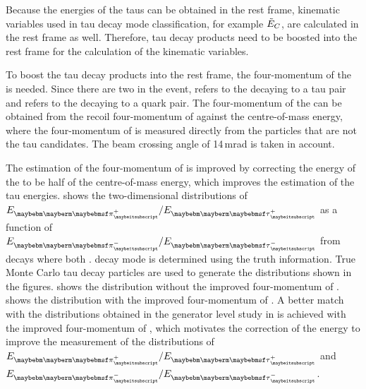 Because the energies of the taus can be obtained in the \PZ rest frame, kinematic variables used in tau decay mode classification, for example $\tilde{E}_{C}$, are calculated in the \PZ rest frame as well. Therefore, tau decay products need to be boosted into the \PZ rest frame for the calculation of the kinematic variables.

To boost the tau decay products into the \PZ rest frame, the four-momentum of the \PZ is needed. Since there are two  in the \eeZZQQ event, \ZForTauTau refers to the \PZ decaying to a tau pair and \ZForqq refers to the \PZ decaying to a quark pair. The four-momentum of the \ZForTauTau can be obtained from the recoil four-momentum of \ZForqq against the centre-of-mass energy, where the four-momentum of \ZForqq is measured directly from the particles that are not the tau candidates. The beam crossing angle of  14\,mrad is taken in account.


The estimation of the four-momentum of   \ZForTauTau is improved by correcting the energy of the \ZForTauTau to be half of the centre-of-mass energy, which improves the estimation of the tau energies.  shows the two-dimensional distributions of $E_{\Ppiplus}/E_{\APtauon}$ as a function of $E_{\Ppiminus}/E_{\Ptauon}$ from \ZToTauTau decays where both \tauToPionBoth. \tauToPionBoth decay mode is determined using the truth information. True Monte Carlo tau decay particles are used to generate the distributions shown in the figures.  shows the distribution without the  improved four-momentum of   \ZForTauTau.  shows the distribution with the  improved four-momentum of   \ZForTauTau. A better match with the distributions obtained in the generator level study in  is achieved with the   improved four-momentum of   \ZForTauTau, which motivates the correction of the \ZForTauTau energy to improve the measurement of the distributions of $E_{\Ppiplus} / E_{\APtauon}$ and $E_{\Ppiminus} / E_{\Ptauon}$.


